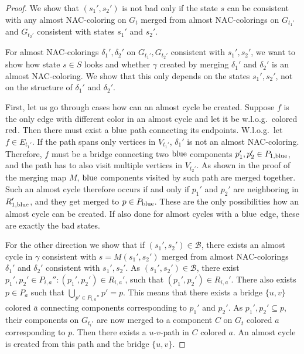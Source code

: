 \begin{proof}
	We show that \( (s_1', s_2') \) is not bad only if the state \( s \)
	can be consistent with any almost NAC-coloring on \( G_t \)
	merged from almost NAC-colorings on \( G_{t_1'} \) and \( G_{t_2'} \)
	consistent with states \( s_1' \) and \( s_2' \).

	For almost NAC-colorings \( \delta_1', \delta_2' \) on \( G_{t_1'}, G_{t_2'} \)
	consistent with \( s_1', s_2' \),
	we want to show how state \( s \in S \) looks and
	whether \rbcol{} \( \gamma \) created by merging \( \delta_1' \) and \( \delta_2' \)
	is an almost NAC-coloring.
	We show that this only depends on the states \( s_1', s_2' \),
	not on the structure of \( \delta_1' \) and \( \delta_2' \).

	First, let us go through cases how can an almost cycle be created.
	Suppose \( f \) is the only edge with different color
	in an almost cycle and let it be w.l.o.g.\ colored \( \text{red} \).
	Then there must exist a \( \text{blue} \) path connecting its endpoints.
	W.l.o.g.\ let \( f \in E_{t_1'} \).
	If the path spans only vertices
	in \( V_{t_1'} \), \( \delta_1' \) is not an almost NAC-coloring.
	Therefore, \( f \) must be
	a bridge connecting two \( \text{blue} \) components \( p_1', p_2' \in P_{1,\text{blue}} \),
	and the path has to also visit multiple vertices in \( V_{t_2'} \).
	As shown in the proof of the merging map \( M \), \( \text{blue} \) components
	visited by such path are merged together.
	Such an almost cycle therefore occurs
	if and only if \( p_1' \) and \( p_2' \) are neighboring in \( R_{1,\text{blue}}' \),
	and they get merged to \( p \in P_{\text{blue}} \).
	These are the only possibilities how an almost cycle can be created.
	If also done for almost cycles with a \( \text{blue} \) edge,
	these are exactly the bad states.

	For the other direction we show that if \( (s_1', s_2') \in \mathcal{B} \),
	there exists an almost cycle
	in \rbcol{} \( \gamma \) consistent with \( s = M(s_1', s_2') \)
	merged from almost NAC-colorings \( \delta_1' \) and \( \delta_2' \)
	consistent with \( s_1', s_2' \).
	As \( (s_1', s_2') \in \mathcal{B} \),
	there exist \( p_1', p_2' \in P_{i, a}'' : (p_1', p_2') \in R_{i, a}' \),
	such that \( (p_1', p_2') \in R_{i, a}' \).
	There also exists \( p \in P_{a} \) such that \( \bigcup_{p' \in P_{i, a}''} p' = p \).
	This means that there exists a bridge \( \{u, v\} \) colored \( \bar{a} \) connecting
	components corresponding to \( p_1' \) and \( p_2' \).
	As \( p_1', p_2' \subseteq p \),
	their components on \( G_{t_i'} \) are now merged
	to a component \( C \) on \( G_t \) colored \( a \) corresponding to \( p \).
	Then there exists a \( u \)-\( v \)-path in \( C \) colored \( a \).
	An almost cycle is created from this path and the bridge \( \{u, v\} \).
\end{proof}
%

